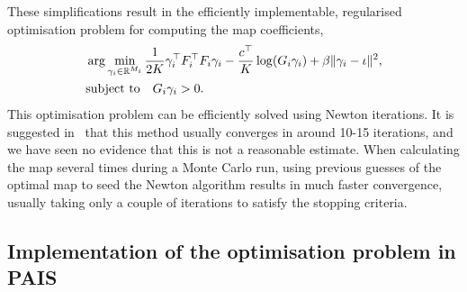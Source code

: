 \documentclass[final]{siamltex}
\begin{document}
These simplifications result in the efficiently implementable, regularised optimisation problem for
computing the map coefficients,
\begin{align}\label{eq:final_map_optim}
	&\arg\min_{\gamma_i\in\mathbb{R}^{M_i}} \frac{1}{2K}\gamma_i^\top F_i^\top F_i\gamma_i -
		\frac{c^\top}{K}\log(G_i\gamma_i) + \beta\|\gamma_i-\iota\|^2, \\
	&\text{subject to} \quad G_i\gamma_i > 0. \notag
\end{align}
This optimisation problem can be efficiently solved using Newton iterations. It is suggested
in~\cite{parno2014transport} that this method usually converges in around 10-15 iterations, and we
have seen no evidence that this is not a reasonable estimate. When calculating the map several times
during a Monte Carlo run, using previous guesses of the optimal map to seed the Newton algorithm
results in much faster convergence, usually taking only a couple of iterations to satisfy the stopping
criteria.

\subsection{Implementation of the optimisation problem in PAIS}
\end{document}
